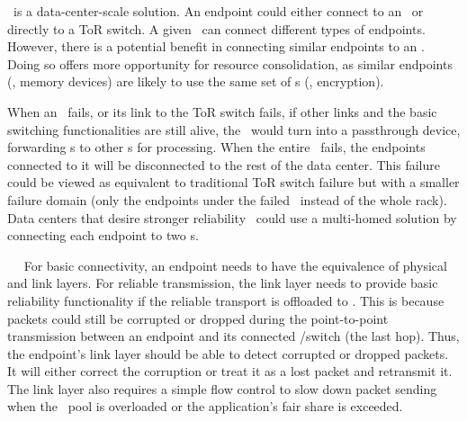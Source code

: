 \snic\ is a data-center-scale solution. %
An endpoint could either connect to an \snic\ or directly to a ToR switch.
A given \snic\ can connect different types of endpoints.
However, there is a potential benefit in connecting similar endpoints to an \snic.
Doing so offers more opportunity for resource consolidation, as similar endpoints (\eg, memory devices) are likely to use the same set of \nt{}s (\eg, encryption).

When an \snic\ fails, or its link to the ToR switch fails, if other links and the basic switching functionalities are still alive, the \snic\ would turn into a passthrough device, forwarding \nt{}s to other \snic{}s for processing.
When the entire \snic\ fails, the endpoints connected to it will be disconnected to the rest of the data center.
This failure could be viewed as equivalent to traditional ToR switch failure but with a smaller failure domain (only the endpoints under the failed \snic\ instead of the whole rack).
Data centers that desire stronger reliability~\cite{pangu-nsdi21} could use a multi-homed solution by connecting each endpoint to two \snic{}s.
\fi

~~
For basic connectivity, an endpoint needs to have the equivalence of physical and link layers.
For reliable transmission, the link layer needs to provide basic reliability functionality if the reliable transport is offloaded to \snic.
This is because packets could still be corrupted or dropped during the point-to-point transmission between an endpoint and its connected \snic/switch (the last hop).
Thus, the endpoint's link layer should be able to detect corrupted or dropped packets. It will either correct the corruption or treat it as a lost packet and retransmit it.
The link layer also requires a simple flow control to slow down packet sending when the \snic\ pool is overloaded or the application's fair share is exceeded.

